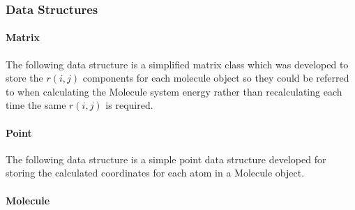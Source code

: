\documentclass[conference]{IEEEtran}
\begin{document}
\subsubsection{Data Structures}

\paragraph{Matrix}

The following data structure is a simplified matrix class which was developed to store the \(r(i,j)\)
components for each molecule object so they could be referred to when calculating the Molecule
system energy rather than recalculating each time the same \(r(i,j)\) is required.\\


\paragraph{Point}

The following data structure is a simple point data structure developed for storing the calculated coordinates
for each atom in a Molecule object.\\


\paragraph{Molecule}
\end{document}
